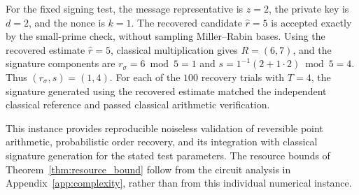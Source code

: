 \begin{revision}
For the fixed signing test, the message representative is $z=2$, the private key is $d=2$, and the nonce is $k=1$. The recovered candidate $\hat r=5$ is accepted exactly by the small-prime check, without sampling Miller--Rabin bases. Using the recovered estimate $\hat r=5$, classical multiplication gives $R=(6,7)$, and the signature components are $r_{\sigma}=6\bmod5=1$ and $s=1^{-1}(2+1\cdot2)\bmod5=4$. Thus $(r_{\sigma},s)=(1,4)$. For each of the $100$ recovery trials with $T=4$, the signature generated using the recovered estimate matched the independent classical reference and passed classical arithmetic verification.

This instance provides reproducible noiseless validation of reversible point arithmetic, probabilistic order recovery, and its integration with classical signature generation for the stated test parameters. The resource bounds of Theorem~\ref{thm:resource_bound} follow from the circuit analysis in Appendix~\ref{app:complexity}, rather than from this individual numerical instance.
\end{revision}
